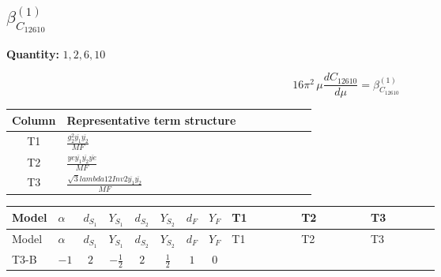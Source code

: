 \documentclass[8pt]{article}
\begin{document}
\begin{landscape}
\section*{$\beta_{C_{12610}}^{(1)}$}
\noindent\textbf{Quantity: }$\mathrm{1,2,6,10}$\par\smallskip
\[16\pi^2\,\mu\frac{d C_{12610}}{d\mu}=\beta_{C_{12610}}^{(1)}\]
\begin{center}
\begin{tabular}{@{}c >{\raggedright\arraybackslash}p{0.82\linewidth}@{}}
\toprule
Column & Representative term structure \\
\midrule
T1 & \(\displaystyle \frac{g_{2}^{2} \overline{y_{1}} \overline{y_{2}}}{MF}\) \\
\midrule
T2 & \(\displaystyle \frac{ye \overline{y_{1}} \overline{y_{2}} \overline{ye}}{MF}\) \\
\midrule
T3 & \(\displaystyle \frac{\sqrt{3} lambda12Inv2 \overline{y_{1}} \overline{y_{2}}}{MF}\) \\
\midrule
\bottomrule
\end{tabular}
\end{center}
\smallskip
\tiny
\begin{longtable}{@{}llcccccc >{\raggedright\arraybackslash}p{0.21\linewidth} >{\raggedright\arraybackslash}p{0.21\linewidth} >{\raggedright\arraybackslash}p{0.21\linewidth}@{}}
\toprule
Model & $\alpha$ & $d_{S_1}$ & $Y_{S_1}$ & $d_{S_2}$ & $Y_{S_2}$ & $d_F$ & $Y_F$ & T1 & T2 & T3 \\
\midrule
\endfirsthead
\toprule
Model & $\alpha$ & $d_{S_1}$ & $Y_{S_1}$ & $d_{S_2}$ & $Y_{S_2}$ & $d_F$ & $Y_F$ & T1 & T2 & T3 \\
\midrule
\endhead
T3-B & $-1$ & $2$ & $-\frac{1}{2}$ & $2$ & $\frac{1}{2}$ & $1$ & $0$ & \scriptsize\adjustbox{max width=\linewidth}{$\begin{gathered} \frac{3 g_{2}^{2} \overline{y_{1}} \overline{y_{2}}}{8 MF}\end{gathered}$} & \scriptsize\adjustbox{max width=\linewidth}{$\begin{gathered} - \frac{ye \overline{y_{1}} \overline{y_{2}} \overline{ye}}{8 MF}\end{gathered}$} & \scriptsize\adjustbox{max width=\linewidth}{$\begin{gathered} \frac{\sqrt{3} lambda12Inv2 \overline{y_{1}} \overline{y_{2}}}{6 MF}\end{gathered}$} \\
\midrule
\bottomrule
\end{longtable}
\clearpage

\end{landscape}
\end{document}
